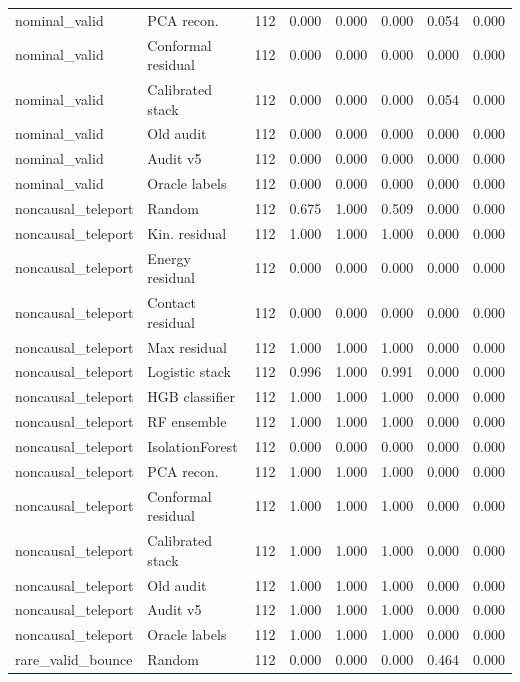 {\begin{longtable}{llrrrrrr}
nominal\_valid & PCA recon. & 112 & 0.000 & 0.000 & 0.000 & 0.054 & 0.000 \\
nominal\_valid & Conformal residual & 112 & 0.000 & 0.000 & 0.000 & 0.000 & 0.000 \\
nominal\_valid & Calibrated stack & 112 & 0.000 & 0.000 & 0.000 & 0.054 & 0.000 \\
nominal\_valid & Old audit & 112 & 0.000 & 0.000 & 0.000 & 0.000 & 0.000 \\
nominal\_valid & Audit v5 & 112 & 0.000 & 0.000 & 0.000 & 0.000 & 0.000 \\
nominal\_valid & Oracle labels & 112 & 0.000 & 0.000 & 0.000 & 0.000 & 0.000 \\
noncausal\_teleport & Random & 112 & 0.675 & 1.000 & 0.509 & 0.000 & 0.000 \\
noncausal\_teleport & Kin. residual & 112 & 1.000 & 1.000 & 1.000 & 0.000 & 0.000 \\
noncausal\_teleport & Energy residual & 112 & 0.000 & 0.000 & 0.000 & 0.000 & 0.000 \\
noncausal\_teleport & Contact residual & 112 & 0.000 & 0.000 & 0.000 & 0.000 & 0.000 \\
noncausal\_teleport & Max residual & 112 & 1.000 & 1.000 & 1.000 & 0.000 & 0.000 \\
noncausal\_teleport & Logistic stack & 112 & 0.996 & 1.000 & 0.991 & 0.000 & 0.000 \\
noncausal\_teleport & HGB classifier & 112 & 1.000 & 1.000 & 1.000 & 0.000 & 0.000 \\
noncausal\_teleport & RF ensemble & 112 & 1.000 & 1.000 & 1.000 & 0.000 & 0.000 \\
noncausal\_teleport & IsolationForest & 112 & 0.000 & 0.000 & 0.000 & 0.000 & 0.000 \\
noncausal\_teleport & PCA recon. & 112 & 1.000 & 1.000 & 1.000 & 0.000 & 0.000 \\
noncausal\_teleport & Conformal residual & 112 & 1.000 & 1.000 & 1.000 & 0.000 & 0.000 \\
noncausal\_teleport & Calibrated stack & 112 & 1.000 & 1.000 & 1.000 & 0.000 & 0.000 \\
noncausal\_teleport & Old audit & 112 & 1.000 & 1.000 & 1.000 & 0.000 & 0.000 \\
noncausal\_teleport & Audit v5 & 112 & 1.000 & 1.000 & 1.000 & 0.000 & 0.000 \\
noncausal\_teleport & Oracle labels & 112 & 1.000 & 1.000 & 1.000 & 0.000 & 0.000 \\
rare\_valid\_bounce & Random & 112 & 0.000 & 0.000 & 0.000 & 0.464 & 0.000 \\

\end{longtable}}
